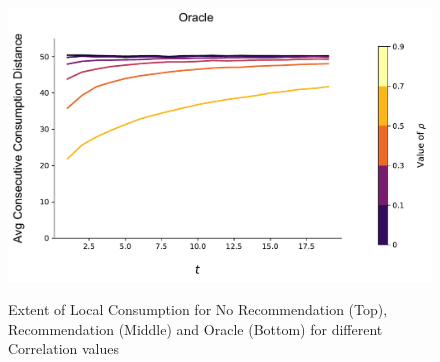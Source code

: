 \documentclass[sigconf]{acmart}
\begin{document}
\begin{figure}[t]
\includegraphics[width=\linewidth]{figures/rho_consumption_dist_N_200T_20_omni.pdf}\\
\caption{Extent of Local Consumption for No Recommendation (Top), Recommendation (Middle) and Oracle (Bottom) for different Correlation values}
\label{fig:local_consumption_across_rho}
\end{figure}
\end{document}
